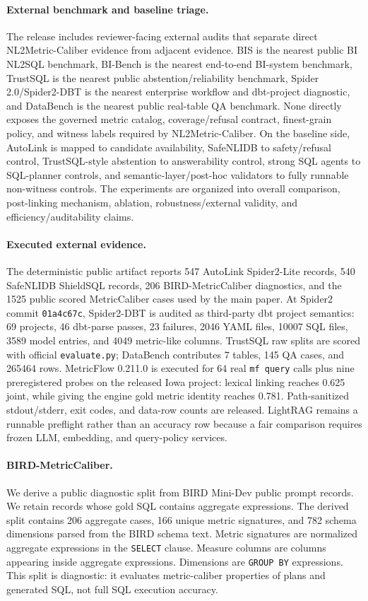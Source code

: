 \documentclass[letterpaper]{article}
\begin{document}
\paragraph{External benchmark and baseline triage.}
The release includes reviewer-facing external audits that separate direct NL2Metric-Caliber evidence from adjacent evidence. BIS is the nearest public BI NL2SQL benchmark, BI-Bench is the nearest end-to-end BI-system benchmark, TrustSQL is the nearest public abstention/reliability benchmark, Spider 2.0/Spider2-DBT is the nearest enterprise workflow and dbt-project diagnostic, and DataBench is the nearest public real-table QA benchmark. None directly exposes the governed metric catalog, coverage/refusal contract, finest-grain policy, and witness labels required by NL2Metric-Caliber. On the baseline side, AutoLink is mapped to candidate availability, SafeNLIDB to safety/refusal control, TrustSQL-style abstention to answerability control, strong SQL agents to SQL-planner controls, and semantic-layer/post-hoc validators to fully runnable non-witness controls. The experiments are organized into overall comparison, post-linking mechanism, ablation, robustness/external validity, and efficiency/auditability claims.

\paragraph{Executed external evidence.}
The deterministic public artifact reports 547 AutoLink Spider2-Lite records, 540 SafeNLIDB ShieldSQL records, 206 BIRD-MetricCaliber diagnostics, and the 1525 public scored MetricCaliber cases used by the main paper. At Spider2 commit \texttt{01a4c67c}, Spider2-DBT is audited as third-party dbt project semantics: 69 projects, 46 dbt-parse passes, 23 failures, 2046 YAML files, 10007 SQL files, 3589 model entries, and 4049 metric-like columns. TrustSQL raw splits are scored with official \texttt{evaluate.py}; DataBench contributes 7 tables, 145 QA cases, and 265464 rows. MetricFlow 0.211.0 is executed for 64 real \texttt{mf query} calls plus nine preregistered probes on the released Iowa project: lexical linking reaches 0.625 joint, while giving the engine gold metric identity reaches 0.781. Path-sanitized stdout/stderr, exit codes, and data-row counts are released. LightRAG remains a runnable preflight rather than an accuracy row because a fair comparison requires frozen LLM, embedding, and query-policy services.

\paragraph{BIRD-MetricCaliber.}
We derive a public diagnostic split from BIRD Mini-Dev public prompt records. We retain records whose gold SQL contains aggregate expressions. The derived split contains 206 aggregate cases, 166 unique metric signatures, and 782 schema dimensions parsed from the BIRD schema text. Metric signatures are normalized aggregate expressions in the \texttt{SELECT} clause. Measure columns are columns appearing inside aggregate expressions. Dimensions are \texttt{GROUP BY} expressions. This split is diagnostic: it evaluates metric-caliber properties of plans and generated SQL, not full SQL execution accuracy.
\end{document}
